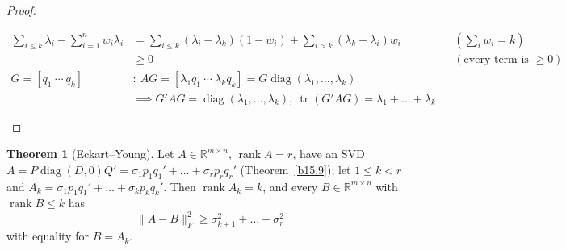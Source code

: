 \documentclass[12pt]{article}
\newcommand{\R}{\mathbb R}
\DeclareMathOperator{\tr}{tr}
\DeclareMathOperator{\diag}{diag}
\DeclareMathOperator{\rank}{rank}
\theoremstyle{definition}
\newtheorem{theorem}{Theorem}
\newcommand{\boardtop}{\vspace*{-\abovedisplayskip}}
\begin{document}
\begin{proof}
\begin{board}
\boardtop
\begin{align*}
\textstyle\sum_{i\leqslant k}\lambda_i-\sum_{i=1}^nw_i\lambda_i
&=\textstyle\sum_{i\leqslant k}(\lambda_i-\lambda_k)(1-w_i)+\sum_{i>k}(\lambda_k-\lambda_i)w_i
&&(\textstyle\sum_iw_i=k)\\
&\geqslant0&&(\text{every term is \(\geqslant0\)})\\
G=[q_1\ \cdots\ q_k]&\colon\ AG=[\lambda_1q_1\ \cdots\ \lambda_kq_k]=G\diag(\lambda_1,\dots,\lambda_k)\\
&\implies G'AG=\diag(\lambda_1,\dots,\lambda_k),\ \tr(G'AG)=\lambda_1+\dots+\lambda_k
\end{align*}
\end{board}
\nopagebreak
\end{proof}

\begin{theorem}[Eckart--Young]\label{b15.17}
Let \(A\in\R^{m\times n}\), \(\rank A=r\), have an SVD \(A=P\diag(D,0)Q'=\sigma_1p_1q_1'+\dots+\sigma_rp_rq_r'\)
(Theorem~\ref{b15.9}); let \(1\leqslant k<r\) and \(A_k=\sigma_1p_1q_1'+\dots+\sigma_kp_kq_k'\). Then \(\rank A_k=k\), and
every \(B\in\R^{m\times n}\) with \(\rank B\leqslant k\) has
\[
\lVert A-B\rVert_F^2\geqslant\sigma_{k+1}^2+\dots+\sigma_r^2
\]
with equality for \(B=A_k\).
\end{theorem}
\end{document}

